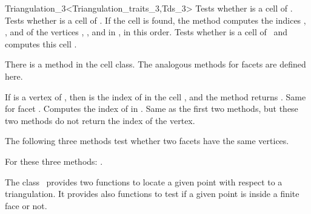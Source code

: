\begin{ccRefClass}{Triangulation_3<Triangulation_traits_3,Tds_3>}
{Tests whether  is a cell of \ccVar.}
\ccGlue
{}
{Tests whether  is a cell of \ccVar. 
If the cell  is found, the method
computes the indices , ,  and  of the
vertices , ,  and  in , in this
order. 
}
\ccGlue
{}
{Tests whether  is a cell of \ccVar\ and computes 
this cell .
}

There is a method  in the cell class. The analogous
methods for facets are defined here.

{If  is a vertex of , then  is the index of
 in the cell , and the method returns .
}
\ccGlue
{}
{Same for facet . Computes the index  of  in
.}
\ccGlue
{}
{}
\ccGlue
{}
{Same as the first two methods, but these two methods do not return the
index of the vertex.}

The following three methods test whether two facets have the same
vertices.

{}
\ccGlue
{}
{}
\ccGlue
{}
{For these three methods: .}



The class \ccClassTemplateName\  provides two functions to locate
a given point with respect to a triangulation. It provides
also functions to test if a given point is inside a finite face
or not.


\end{ccRefClass}
